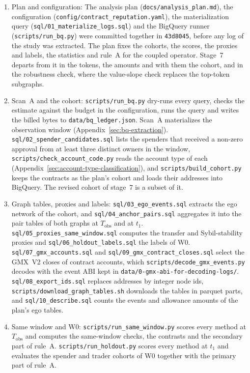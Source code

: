 \begin{enumerate}
\item Plan and configuration: The analysis plan (\texttt{docs/analysis\_plan.md}), the configuration (\texttt{config/contract\_reputation.yaml}), the materialization query (\texttt{sql/01\_materialize\_logs.sql}) and the BigQuery runner (\texttt{scripts/run\_bq.py}) were committed together in \texttt{43d8045}, before any log of the study was extracted. The plan fixes the cohorts, the scores, the proxies and labels, the statistics and rule~A for the coupled operator. Stage~7 departs from it in the tokens, the amounts and with them the cohort, and in the robustness check, where the value-slope check replaces the top-token subgraphs.
\item Scan~A and the cohort: \texttt{scripts/run\_bq.py} dry-runs every query, checks the estimate against the budget in the configuration, runs the query and writes the billed bytes to \texttt{data/bq\_ledger.json}. Scan~A materializes the observation window (Appendix~\ref{sec:bq-extraction}). \texttt{sql/02\_spender\_candidates.sql} lists the spenders that received a non-zero approval from at least three distinct owners in the window, \texttt{scripts/check\_account\_code.py} reads the account type of each (Appendix~\ref{sec:account-type-classification}), and \texttt{scripts/build\_cohort.py} keeps the contracts as the plan's cohort and loads their addresses into BigQuery. The revised cohort of stage~7 is a subset of it.
\item Graph tables, proxies and labels: \texttt{sql/03\_ego\_events.sql} extracts the ego network of the cohort, and \texttt{sql/04\_anchor\_pairs.sql} aggregates it into the pair tables of both graphs at $T_{\text{obs}}$ and at $t_1$. \texttt{sql/05\_proxies\_same\_window.sql} computes the transfer and Sybil-stability proxies and \texttt{sql/06\_holdout\_labels.sql} the labels of W0. \texttt{sql/07\_gmx\_accounts.sql} and \texttt{sql/09\_gmx\_contract\_closes.sql} select the GMX~V2 closes of contract accounts, which \texttt{scripts/decode\_gmx\_events.py} decodes with the event ABI kept in \texttt{data/0-gmx-abi-for-decoding-logs/}. \texttt{sql/08\_export\_ids.sql} replaces addresses by integer node ids, \texttt{scripts/download\_graph\_tables.sh} downloads the tables in parquet parts, and \texttt{sql/10\_describe.sql} counts the events and allowance amounts of the plan's ego tables.
\item Same window and W0: \texttt{scripts/run\_same\_window.py} scores every method at $T_{\text{obs}}$ and computes the same-window checks, the contrasts and the secondary part of rule~A. \texttt{scripts/run\_holdout.py} scores every method at $t_1$ and evaluates the spender and trader cohorts of W0 together with the primary part of rule~A.

\end{enumerate}
